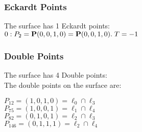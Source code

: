 \documentclass{article}
\newcommand{\bP}{{\bf P}}
\begin{document}
{\subsubsection*{Eckardt Points}
The surface has 1 Eckardt points:\\
$0 : P_{2}=\bP(0, 0, 1, 0) = \bP(0, 0, 1, 0).\; T= -1$\\
\subsubsection*{Double Points}
The surface has 4 Double points:\\
The double points on the surface are:\\
\begin{multicols}{2}
\noindent
$P_{12} = ( 1, 0, 1, 0 ) = \ell_{0} \cap \ell_{3} $\\
$P_{75} = ( 1, 0, 0, 1 ) = \ell_{1} \cap \ell_{4} $\\
$P_{82} = ( 0, 1, 0, 1 ) = \ell_{2} \cap \ell_{3} $\\
$P_{146} = ( 0, 1, 1, 1 ) = \ell_{2} \cap \ell_{4} $\\
\end{multicols}
}
\end{document}
